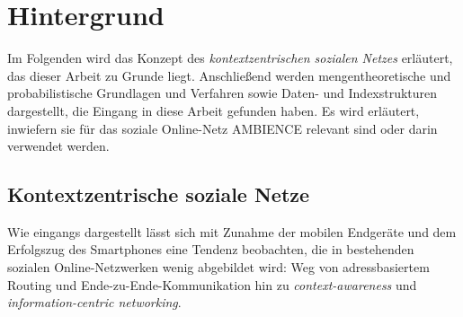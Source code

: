 \chapter{Hintergrund}\label{ch:hintergrund}
Im Folgenden wird das Konzept des \textit{kontextzentrischen sozialen Netzes} erläutert, das dieser Arbeit zu Grunde liegt. Anschließend werden mengentheoretische und probabilistische Grundlagen und Verfahren sowie Daten- und Indexstrukturen dargestellt, die Eingang in diese Arbeit gefunden haben. Es wird erläutert, inwiefern sie für das soziale Online-Netz AMBIENCE relevant sind oder darin verwendet werden. 
\section{Kontextzentrische soziale Netze}\label{sec:kontext}
Wie eingangs dargestellt lässt sich mit Zunahme der mobilen Endgeräte und dem Erfolgszug des Smartphones eine Tendenz beobachten, die in bestehenden sozialen Online-Netzwerken wenig abgebildet wird: Weg von adressbasiertem Routing und Ende-zu-Ende-Kommunikation hin zu \textit{context-awareness} und \textit{information-centric networking}. 


